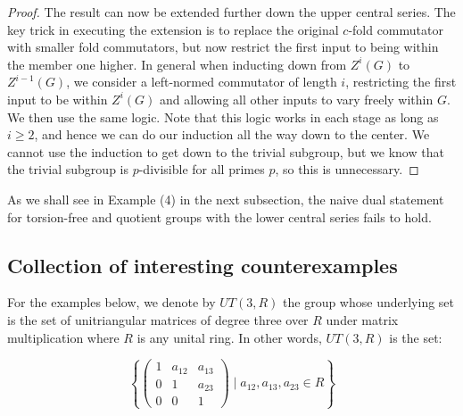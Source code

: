 \begin{proof}
  The result can now be extended further down the upper central
  series. The key trick in executing the extension is to replace the
  original $c$-fold commutator with smaller fold commutators, but now
  restrict the first input to being within the member one higher. In
  general when inducting down from $Z^i(G)$ to $Z^{i-1}(G)$, we
  consider a left-normed commutator of length $i$, restricting the
  first input to be within $Z^i(G)$ and allowing all other inputs to
  vary freely within $G$. We then use the same logic. Note that this
  logic works in each stage as long as $i \ge 2$, and hence we can do
  our induction all the way down to the center. We cannot use the
  induction to get down to the trivial subgroup, but we know that the
  trivial subgroup is $p$-divisible for all primes $p$, so this is
  unnecessary.
\end{proof}

As we shall see in Example (4) in the next subsection, the naive dual
statement for torsion-free and quotient groups with the lower central
series fails to hold.

\subsection{Collection of interesting counterexamples}\label{sec:group-ctex}

For the examples below, we denote by $UT(3,R)$ the group whose
underlying set is the set of unitriangular matrices of degree three
over $R$ under matrix multiplication where $R$ is any unital ring. In
other words, $UT(3,R)$ is the set:

$$\left \{\begin{pmatrix}
1 & a_{12} & a_{13} \\
0 & 1 & a_{23}\\
0 & 0 & 1\end{pmatrix} \mid a_{12},a_{13},a_{23} \in R \right \}$$

